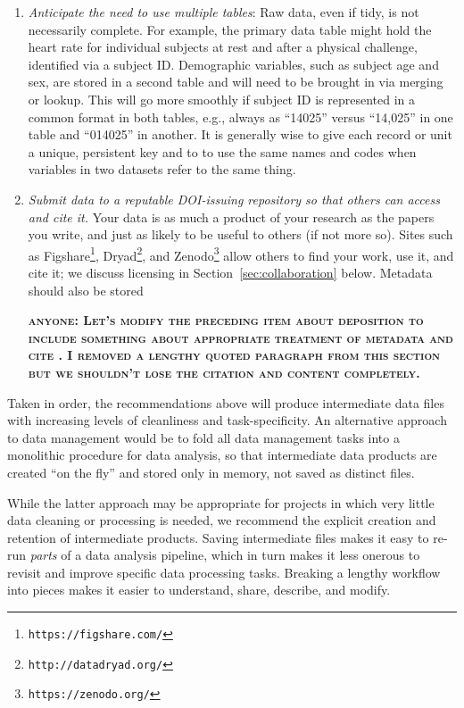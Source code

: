 \documentclass[10pt]{article}
\newcommand{\fixme}[2]{\textsc{\textbf{{#1}: {#2}}}}
\newcommand{\recommend}[1]{\textit{#1}}
\newcommand{\withurl}[2]{{#1}\footnote{\texttt{#2}}}
\begin{document}
\begin{enumerate}
\item
  \recommend{Anticipate the need to use multiple tables}: Raw data, even if tidy, is not
  necessarily complete. For example, the primary data table might hold the heart rate for
  individual subjects at rest and after a physical challenge, identified via a subject ID.
  Demographic variables, such as subject age and sex, are stored in a second table and
  will need to be brought in via merging or lookup. This will go more smoothly if subject
  ID is represented in a common format in both tables, e.g., always as ``14025'' versus
  ``14,025'' in one table and ``014025'' in another. It is generally wise to give each
  record or unit a unique, persistent key and to to use the same names and codes when 
  variables in two datasets refer to the same thing.
  
\item
  \recommend{Submit data to a reputable DOI-issuing repository so that
    others can access and cite it.}  Your data is as much a product of
  your research as the papers you write, and just as likely to be
  useful to others (if not more so).  Sites such as
  \withurl{Figshare}{https://figshare.com/},
  \withurl{Dryad}{http://datadryad.org/}, and
  \withurl{Zenodo}{https://zenodo.org/} allow others to find your work,
  use it, and cite it; we discuss licensing in
  Section~\ref{sec:collaboration} below. Metadata should also be stored 
  
  \fixme{anyone}{Let's modify the preceding item about deposition to include something about
  appropriate treatment of metadata and cite \cite{wickes2015}. I removed a lengthy
  quoted paragraph from this section but we shouldn't lose the citation and content
  completely.}

\end{enumerate}

Taken in order, the recommendations above will produce intermediate
data files with increasing levels of cleanliness and
task-specificity. An alternative approach to data management would be
to fold all data management tasks into a monolithic procedure for data analysis,
so that intermediate data products are created ``on the fly'' and stored only in
memory, not saved as distinct files.

While the latter approach may be appropriate for projects in which very
little data cleaning or processing is needed, we recommend the explicit
creation and retention of intermediate products. Saving intermediate
files makes it easy to re-run \emph{parts} of a data analysis pipeline,
which in turn makes it less onerous to revisit and improve specific data
processing tasks. Breaking a lengthy workflow into pieces makes it
easier to understand, share, describe, and modify.
\end{document}
